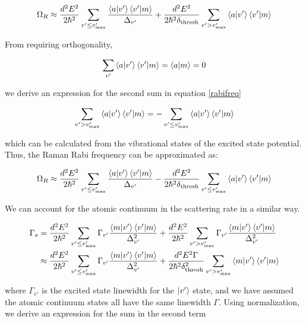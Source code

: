 \documentclass[aps,secnumarabic,amsmath,amssymb,superscriptaddress]{revtex4}
\begin{document}
\begin{equation}
  \Omega_R \approx \frac{d^2E^2}{2\hbar^2}\displaystyle\sum_{v' \leq v'_{\text{max}}} \frac{\braket{a|v'}\braket{v'|m}}{\Delta_{v'}} +  \frac{d^2E^2}{2\hbar^2\delta_{\text{thresh}}}\displaystyle\sum_{v' > v'_{\text{max}}} \braket{a|v'}\braket{v'|m}  \label{rabifreq}
\end{equation}

From requiring orthogonality,

\begin{equation}
  \displaystyle\sum_{v'} \braket{a|v'}\braket{v'|m} = \braket{a|m} = 0
\end{equation}

we derive an expression for the second sum in equation \ref{rabifreq}

\begin{equation}
  \displaystyle\sum_{v'> v'_{\text{max}}} \braket{a|v'}\braket{v'|m} = -\displaystyle\sum_{v' \leq v'_{\text{max}}} \braket{a|v'}\braket{v'|m}
\end{equation}

which can be calculated from the vibrational states of the excited state potential. Thus, the Raman Rabi frequency can be approximated as:

\begin{equation}
  \Omega_R \approx \frac{d^2E^2}{2\hbar^2}\displaystyle\sum_{v' \leq v'_{\text{max}}} \frac{\braket{a|v'}\braket{v'|m}}{\Delta_{v'}} -  \frac{d^2E^2}{2\hbar^2\delta_{\text{thresh}}}\displaystyle\sum_{v' \leq v'_{\text{max}}} \braket{a|v'}\braket{v'|m}
\end{equation}

We can account for the atomic continuum in the scattering rate in a similar way.

\begin{align}
  \Gamma_s &= \frac{d^2E^2}{2\hbar^2}\displaystyle\sum_{v' \leq v'_{\text{max}}}\Gamma_{v'} \frac{\braket{m|v'}\braket{v'|m}}{\Delta_{v'}^2} + \frac{d^2E^2}{2\hbar^2}\displaystyle\sum_{v' > v'_{\text{max}}}\Gamma_{v'} \frac{\braket{m|v'}\braket{v'|m}}{\Delta_{v'}^2} \\
           &\approx \frac{d^2E^2}{2\hbar^2}\displaystyle\sum_{v' \leq v'_{\text{max}}}\Gamma_{v'} \frac{\braket{m|v'}\braket{v'|m}}{\Delta_{v'}^2} + \frac{d^2E^2\Gamma}{2\hbar^2\delta_{\text{thresh}}^2}\displaystyle\sum_{v' > v'_{\text{max}}}\braket{m|v'}\braket{v'|m}
\end{align}

where $\Gamma_{v'}$ is the excited state linewidth for the $\ket{v'}$ state, and we have assumed the atomic continuum states all have the same linewidth $\Gamma$. Using normalization, we derive an expression for the sum in the second term
\end{document}
